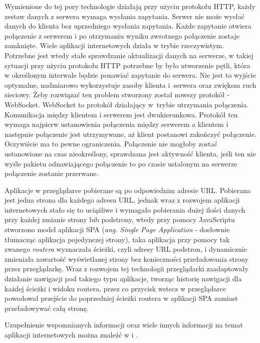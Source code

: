 \documentclass[12pt,a4paper,oneside]{book}
\begin{document}
Wymienione do tej pory technologie działają przy użyciu protokołu HTTP, każdy zestaw danych z serwera wymaga wysłania zapytania. Serwer nie może wysłać danych do klienta bez uprzedniego wysłania zapytania. Każde zapytanie otwiera połączenie z serwerem i po otrzymaniu wyniku zwrotnego połączenie zostaje zamknięte. Wiele aplikacji internetowych działa w trybie rzeczywistym. Potrzebne jest wtedy stałe sprawdzanie aktualizacji danych na serwerze, w takiej sytuacji przy użyciu protokołu HTTP potrzebne by było utworzenie pętli, która w określonym interwale będzie ponawiać zapytanie do serwera. Nie jest to wyjście optymalne, nadmiarowo wykorzystuje zasoby klienta i~serwera oraz zwiększa ruch sieciowy. Żeby rozwiązać ten problem stworzony został nowszy protokół - WebSocket. WebSocket to protokół działający w~trybie utrzymania połączenia. Komunikacja między klientem i serwerem jest dwukierunkowa. Protokół ten wymaga najpierw ustanowienia połączenia między serwerem a klientem i następnie połączenie jest utrzymywane, aż klient postanowi zakończyć połączenie. Oczywiście ma to pewne ograniczenia. Połączenie nie mogłoby zostać ustanowione na czas nieokreślony, sprawdzana jest aktywność klienta, jeśli ten nie wyśle pakietu odnawiającego połączenie to po czasie ustalonym na serwerze połączenie zostanie przerwane.

Aplikacje w przeglądarce pobierane są po odpowiednim adresie URL. Pobierana jest jedna strona dla każdego adresu URL, jednak wraz z rozwojem aplikacji internetowych stało się to uciążliwe i wymagało pobierania dużej ilości danych przy każdej zmianie strony lub podstrony, wtedy przy pomocy JavaScriptu stworzono model aplikacji SPA (\textit{ang. Single Page Application} - dosłownie tłumacząc aplikacja pojedynczej strony), taka aplikacja przy pomocy tak zwanego \textit{routera} wyznaczała ścieżki, czyli adresy URL podstron, i dynamicznie zmieniała zawartość wyświetlanej strony bez konieczności przeładowania strony przez przeglądarkę. Wraz z rozwojem tej technologii przeglądarki zaadaptowały działanie nawigacji pod takiego typu aplikacje, tworząc historię nawigacji dla każdej ścieżki i widoku routera, przez co przycisk wstecz w przeglądarce powodował przejście do poprzedniej ścieżki routera w aplikacji SPA zamiast przeładowywać całą stronę.

Uzupełnienie wspomnianych informacji oraz wiele innych informacji na temat aplikacji internetowych można znaleźć w \cite{WEB_DEVELOPMENT} i \cite{WEB_HIGH_PERFORMANCE}.

\end{document}
